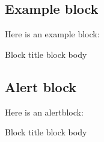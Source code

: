\documentclass[aspectratio=169,10pt]{beamer}
\begin{document}
\subsection{Example block}
\begin{frame}
Here is an example block:

\begin{exampleblock}{Block title}
block body
\end{exampleblock}
\end{frame}


\subsection{Alert block}
\begin{frame}
Here is an alertblock:

\begin{alertblock}{Block title}
block body
\end{alertblock}
\end{frame}
\end{document}
